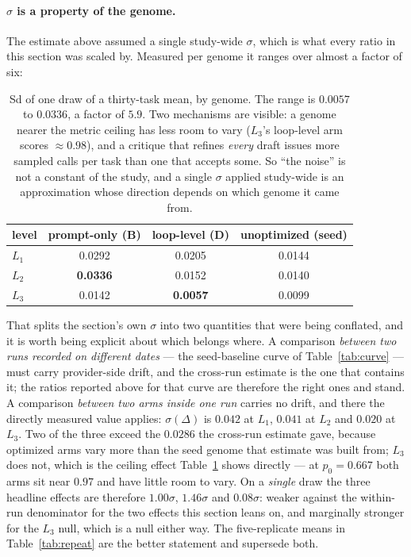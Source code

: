 \documentclass[11pt]{article}
\newcommand{\dd}{\ensuremath{\Delta}}
\begin{document}
\paragraph{\texorpdfstring{$\sigma$}{Sigma} is a property of the genome.} The estimate above
assumed a single study-wide $\sigma$, which is what every ratio in this section was scaled by.
Measured per genome it ranges over almost a factor of six:

\begin{table}[h]
\centering
\small
\begin{tabular}{lccc}
\toprule
level & prompt-only (B) & loop-level (D) & unoptimized (seed) \\
\midrule
$L_1$ & 0.0292 & 0.0205 & 0.0144 \\
$L_2$ & \textbf{0.0336} & 0.0152 & 0.0140 \\
$L_3$ & 0.0142 & \textbf{0.0057} & 0.0099 \\
\bottomrule
\end{tabular}
\caption{Sd of one draw of a thirty-task mean, by genome. The range is $0.0057$ to $0.0336$,
a factor of $5.9$. Two mechanisms are visible: a genome nearer the metric ceiling has less room
to vary ($L_3$'s loop-level arm scores ${\approx}0.98$), and a critique that refines
\emph{every} draft issues more sampled calls per task than one that accepts some. So ``the
noise'' is not a constant of the study, and a single $\sigma$ applied study-wide is an
approximation whose direction depends on which genome it came from.}
\label{tab:sigmagenome}
\end{table}

That splits the section's own $\sigma$ into two quantities that were being conflated, and it is
worth being explicit about which belongs where. A comparison \emph{between two runs recorded on
different dates} --- the seed-baseline curve of Table~\ref{tab:curve} --- must carry
provider-side drift, and the cross-run estimate is the one that contains it; the ratios reported
above for that curve are therefore the right ones and stand. A comparison \emph{between two arms
inside one run} carries no drift, and there the directly measured value applies: $\sigma(\dd)$
is $0.042$ at $L_1$, $0.041$ at $L_2$ and $0.020$ at $L_3$. Two of the three exceed the
$0.0286$ the cross-run estimate gave, because optimized arms vary more than the seed genome that
estimate was built from; $L_3$ does not, which is the ceiling effect
Table~\ref{tab:sigmagenome} shows directly --- at $p_0 = 0.667$ both arms sit near $0.97$ and
have little room to vary.
On a \emph{single} draw the three headline effects are therefore $1.00\sigma$,
$1.46\sigma$ and $0.08\sigma$: weaker against the within-run denominator for the two effects this
section leans on, and marginally stronger for the $L_3$ null, which is a null either way.
The five-replicate means in Table~\ref{tab:repeat} are the better statement and supersede both.
\end{document}
